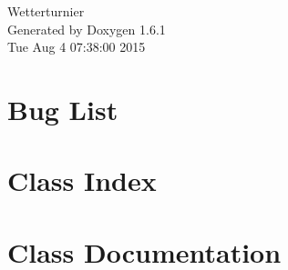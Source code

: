 \documentclass[a4paper]{article}
\begin{document}
\hypersetup{pageanchor=false}
\begin{titlepage}
\vspace*{7cm}
\begin{center}
{\Large Wetterturnier }\\
\vspace*{1cm}
{\large Generated by Doxygen 1.6.1}\\
\vspace*{0.5cm}
{\small Tue Aug 4 07:38:00 2015}\\
\end{center}
\end{titlepage}
\tableofcontents
{}
\hypersetup{pageanchor=true}
\section{Bug List}
\label{bug}
\hypertarget{bug}{}

\section{Class Index}

\section{Class Documentation}







\printindex
\end{document}
